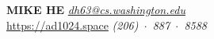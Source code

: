 \documentclass{resume}
\begin{document}
\vspace{-0.5in}

	\MakeUppercase{\Large{\textbf{Mike He}}} \hfill {\em{\href{mailto:dh63@cs.washington.edu}{dh63@cs.washington.edu}}}\\
	\vspace{-5pt}\href{https://ad1024.space}{https://ad1024.space} \hfill{\em (206)~$\cdot$~887~$\cdot$~8588}



\end{document}
